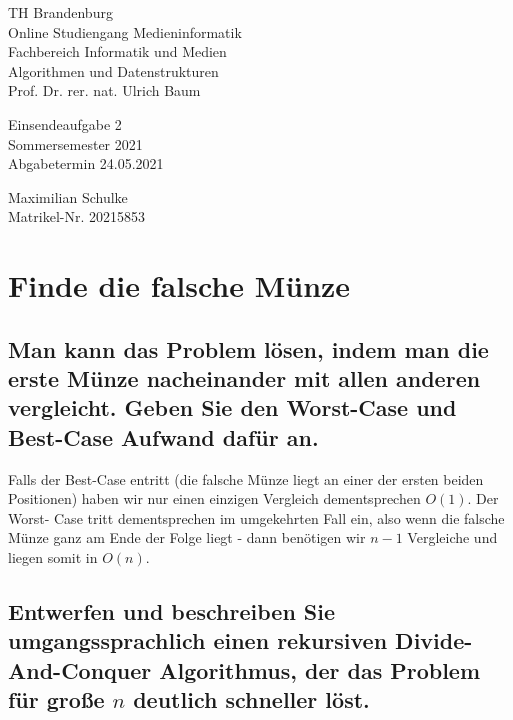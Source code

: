 \documentclass{article}
\begin{document}
\begin{titlepage}
	\begin{flushleft}
		TH Brandenburg \\
		Online Studiengang Medieninformatik \\
		Fachbereich Informatik und Medien \\
		Algorithmen und Datenstrukturen \\
		Prof. Dr. rer. nat. Ulrich Baum
	\end{flushleft}

	\vfill

	\begin{center}
		\Large{Einsendeaufgabe 2}\\[0.5em]
		\large{Sommersemester 2021}\\[0.25em]
		\large{Abgabetermin 24.05.2021}
	\end{center}

	\vfill

	\begin{flushright}
		Maximilian Schulke \\
		Matrikel-Nr. 20215853
	\end{flushright}
\end{titlepage}

\newpage

\section{Finde die falsche Münze}

\subsection{Man kann das Problem lösen, indem man die erste Münze nacheinander
mit allen anderen vergleicht. Geben Sie den Worst-Case und Best-Case Aufwand
dafür an.}

Falls der Best-Case entritt (die falsche Münze liegt an einer der ersten beiden
Positionen) haben wir nur einen einzigen Vergleich dementsprechen $O(1)$. Der
Worst- Case tritt dementsprechen im umgekehrten Fall ein, also wenn die falsche
Münze ganz am Ende der Folge liegt - dann benötigen wir $n - 1$ Vergleiche und
liegen somit in $O(n)$.

\subsection{Entwerfen und beschreiben Sie umgangssprachlich einen rekursiven
Divide-And-Conquer Algorithmus, der das Problem für große $n$ deutlich
schneller löst.}
\end{document}

